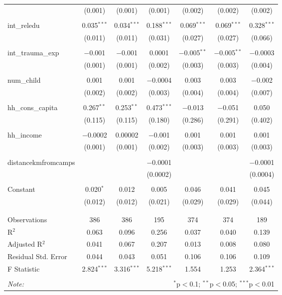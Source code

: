 \begin{table}[H]
\begin{tabular}{@{\extracolsep{4pt}}lcccccc}
  & (0.001) & (0.001) & (0.001) & (0.002) & (0.002) & (0.002) \\ 
  & & & & & & \\ 
 int\_reledu & 0.035$^{***}$ & 0.034$^{***}$ & 0.188$^{***}$ & 0.069$^{***}$ & 0.069$^{***}$ & 0.328$^{***}$ \\ 
  & (0.011) & (0.011) & (0.031) & (0.027) & (0.027) & (0.066) \\ 
  & & & & & & \\ 
 int\_trauma\_exp & $-$0.001 & $-$0.001 & 0.0001 & $-$0.005$^{**}$ & $-$0.005$^{**}$ & $-$0.0003 \\ 
  & (0.001) & (0.001) & (0.002) & (0.003) & (0.003) & (0.004) \\ 
  & & & & & & \\ 
 num\_child & 0.001 & 0.001 & $-$0.0004 & 0.003 & 0.003 & $-$0.002 \\ 
  & (0.002) & (0.002) & (0.003) & (0.004) & (0.004) & (0.007) \\ 
  & & & & & & \\ 
 hh\_cons\_capita & 0.267$^{**}$ & 0.253$^{**}$ & 0.473$^{***}$ & $-$0.013 & $-$0.051 & 0.050 \\ 
  & (0.115) & (0.115) & (0.180) & (0.286) & (0.291) & (0.402) \\ 
  & & & & & & \\ 
 hh\_income & $-$0.0002 & 0.00002 & $-$0.001 & 0.001 & 0.001 & 0.001 \\ 
  & (0.001) & (0.001) & (0.002) & (0.003) & (0.003) & (0.003) \\ 
  & & & & & & \\ 
 distancekmfromcamps &  &  & $-$0.0001 &  &  & $-$0.0001 \\ 
  &  &  & (0.0002) &  &  & (0.0004) \\ 
  & & & & & & \\ 
 Constant & 0.020$^{*}$ & 0.012 & 0.005 & 0.046 & 0.041 & 0.045 \\ 
  & (0.012) & (0.012) & (0.021) & (0.029) & (0.029) & (0.044) \\ 
  & & & & & & \\ 
\hline \\[-1.8ex] 
Observations & 386 & 386 & 195 & 374 & 374 & 189 \\ 
R$^{2}$ & 0.063 & 0.096 & 0.256 & 0.037 & 0.040 & 0.139 \\ 
Adjusted R$^{2}$ & 0.041 & 0.067 & 0.207 & 0.013 & 0.008 & 0.080 \\ 
Residual Std. Error & 0.044 & 0.043 & 0.051 & 0.106 & 0.106 & 0.109 \\ 
F Statistic & 2.824$^{***}$ & 3.316$^{***}$ & 5.218$^{***}$ & 1.554 & 1.253 & 2.364$^{***}$ \\ 
\hline 
\hline \\[-1.8ex] 
\textit{Note:}  & \multicolumn{6}{r}{$^{*}$p$<$0.1; $^{**}$p$<$0.05; $^{***}$p$<$0.01} \\ 
\end{tabular} 
\end{table} 
